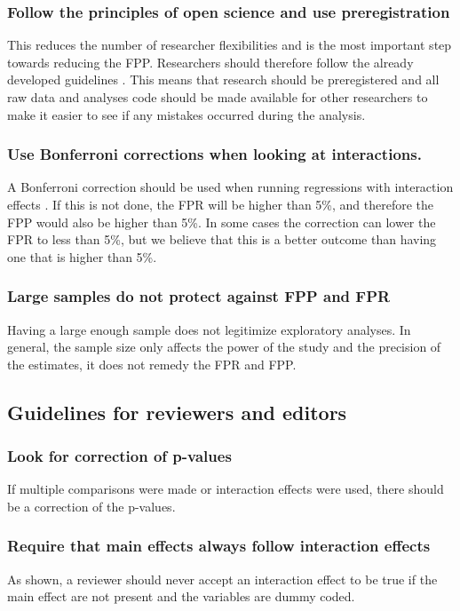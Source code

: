 \subsubsection{Follow the principles of open science and use preregistration}
This reduces the number of researcher flexibilities and is the most important step towards reducing the FPP. Researchers should therefore follow the already developed guidelines \citep{Nosek2015}. This means that research should be preregistered and all raw data and analyses code should be made available for other researchers to make it easier to see if any mistakes occurred during the analysis. 
\subsubsection{Use Bonferroni corrections when looking at interactions.}
A Bonferroni correction should be used when running regressions with interaction effects . If this is not done, the FPR will be higher than 5\%, and therefore the FPP would also be higher than 5\%. In some cases the correction can lower the FPR to less than 5\%, but we believe that this is a better outcome than having one that is higher than 5\%. 
\subsubsection{Large samples do not protect against FPP and FPR}
Having a large enough sample does not legitimize exploratory analyses. In general, the sample size only affects the power of the study and the precision of the estimates, it does not remedy the FPR and FPP. 

\subsection{Guidelines for reviewers and editors}

\subsubsection{Look for correction of p-values}
If multiple comparisons were made or interaction effects were used, there should be a correction of the p-values.
\subsubsection{Require that main effects always follow interaction effects}
As shown, a reviewer should never accept an interaction effect to be true if the main effect are not present and the variables are dummy coded. 

